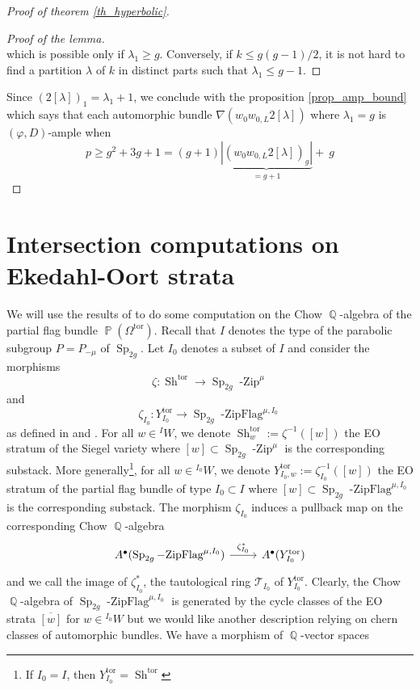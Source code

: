 \documentclass[11pt]{amsart}
\numberwithin{subsection}{section}
\numberwithin{figure}{section}
\numberwithin{table}{section}
\theoremstyle{1}
\theoremstyle{2}
\DeclareMathOperator{\Q}{\mathbb{Q}}
\DeclareMathOperator{\Sp}{Sp}
\DeclareMathOperator{\ZipFlag}{-ZipFlag}
\DeclareMathOperator{\Zip}{-Zip}
\DeclareMathOperator{\Sh}{Sh}
\DeclareMathOperator{\tor}{tor}
\DeclareMathOperator{\Pb}{\mathbb{P}}
\begin{document}
\begin{proof}[Proof of theorem \ref{th_hyperbolic}]
\begin{proof}[Proof of the lemma]
\begin{equation*}
\end{equation*}
which is possible only if $\lambda_1 \geq g$. Conversely, if $k \leq g(g-1)/2$, it is not hard to find a partition $\lambda$ of $k$ in distinct parts such that $\lambda_1 \leq g-1$.
\end{proof}
Since $(2[\lambda])_1 = \lambda_1+1$, we conclude with the proposition \ref{prop_amp_bound} which says that each automorphic bundle $\nabla(w_0w_{0,L}2[\lambda])$ where $\lambda_1 = g$ is $(\varphi,D)$-ample when
\begin{equation*}
p \geq g^2 + 3g +1 = (g+1)\underbrace{|(w_0w_{0,L}2[\lambda])_g|}_{= g+1} + \ g
\end{equation*}
\end{proof}
\appendix
\section{Intersection computations on Ekedahl-Oort strata}\label{appendix1}
We will use the results of \cite{wedhorn2018tautological} to do some computation on the Chow $\Q$-algebra of the partial flag bundle $\Pb(\Omega^{\tor})$. Recall that $I$ denotes the type of the parabolic subgroup $P = P_{-\mu}$ of $\Sp_{2g}$. Let $I_0$ denotes a subset of $I$ and consider the morphisms
\begin{equation*}
\zeta : \Sh^{\tor} \rightarrow \Sp_{2g}\Zip^{\mu}
\end{equation*}
and 
\begin{equation*}
\zeta_{I_0} : Y_{I_0}^{\tor} \rightarrow \Sp_{2g}\ZipFlag^{\mu,I_0}
\end{equation*}
as defined in \cite{MR3989256} and \cite{MR3973104}. For all $w \in {}^IW$, we denote $\Sh^{\tor}_{w} := \zeta^{-1}([w])$  the EO stratum of the Siegel variety where $[w] \subset \Sp_{2g}\Zip^{\mu}$ is the corresponding substack. More generally\footnote{If $I_0 = I$, then $Y^{\tor}_{I_0} = \Sh^{\tor}$}, for all $w \in {}^{I_0}W$, we denote $Y^{\tor}_{I_0,w} := \zeta_{I_0}^{-1}([w])$ the EO stratum of the partial flag bundle of type $I_0 \subset I$ where $[w] \subset \Sp_{2g}\ZipFlag^{\mu,I_0}$ is the corresponding substack. The morphism $\zeta_{I_0}$ induces a pullback map on the corresponding Chow $\Q$-algebra
\begin{equation*}
\begin{tikzcd}
A^{\bullet}(\Sp_{2g}\ZipFlag^{\mu,I_0}) \arrow[r,"\zeta_{I_0}^*"] & A^{\bullet}(Y_{I_0}^{\tor})
\end{tikzcd}
\end{equation*}
and we call the image of $\zeta_{I_0}^*$, the tautological ring $\mathcal{T}_{I_0}$ of $Y^{\tor}_{I_0}$. Clearly, the Chow $\Q$-algebra of $\Sp_{2g}\ZipFlag^{\mu,I_0}$ is generated by the cycle classes of the EO strata $\overline{[w]}$ for $w \in {}^{I_0}W$ but we would like another description relying on chern classes of automorphic bundles. We have a morphism of $\Q$-vector spaces
\end{document}
